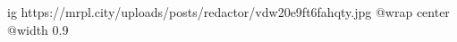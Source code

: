  
 
 
 
 

\ifcmt
  ig https://mrpl.city/uploads/posts/redactor/vdw20e9ft6fahqty.jpg
  @wrap center
  @width 0.9
\fi
